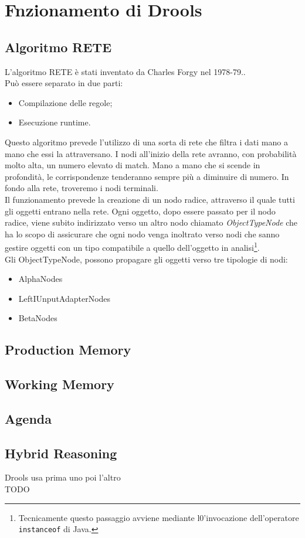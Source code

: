  
 



\section{Fnzionamento di Drools} 


 \subsection{Algoritmo RETE}
 L'algoritmo RETE è stati inventato da Charles Forgy nel 1978-79.. \\
 Può essere separato in due parti:
 \begin{itemize}
 	\item Compilazione delle regole;
 	\item Esecuzione runtime.
 \end{itemize}
 Questo algoritmo prevede l'utilizzo di una sorta di rete che filtra i dati mano a mano che essi la attraversano. I nodi all'inizio della rete avranno, con probabilità molto alta, un numero elevato di match. 
 Mano a mano che si scende in profondità, le corrispondenze tenderanno sempre più a diminuire di numero. In fondo alla rete, troveremo i nodi terminali. \\
Il funzionamento prevede la creazione di un nodo radice, attraverso il quale tutti gli oggetti entrano nella rete. Ogni oggetto, dopo essere passato per il nodo radice, viene subito indirizzato verso un altro nodo chiamato \textit{ObjectTypeNode} che ha lo scopo di assicurare che ogni nodo venga inoltrato verso nodi che sanno gestire oggetti con un tipo compatibile a quello dell'oggetto in analisi\footnote{Tecnicamente questo passaggio avviene mediante l0'invocazione dell'operatore \texttt{instanceof} di Java.}.\\
Gli ObjectTypeNode, possono propagare gli oggetti verso tre tipologie di nodi:
\begin{itemize}
	\item AlphaNodes
	\item LeftIUnputAdapterNodes
	\item BetaNodes
\end{itemize}
 
 \subsection{Production Memory}
 
 \subsection{Working Memory}
 
 \subsection{Agenda}
 
 \subsection{Hybrid Reasoning}
 Drools usa prima uno poi l'altro \textcite{eco:tesi} \\
 TODO